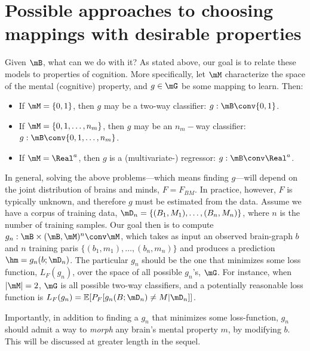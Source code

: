 \section{Possible approaches to choosing mappings with desirable properties} 

\label{sec:possible_approaches_to_choosing_mappings_with_desirable_properties}

Given $\mB$, what can we do with it? As stated above, our goal is to relate these models to properties of cognition. More specifically, let $\mM$ characterize the space of the mental (cognitive) property, and $g \in \mG$ be some mapping to learn. Then:
\begin{itemize}
	\item If $\mM=\{0,1\}$, then $g$ may be a two-way classifier: $g: \mB \conv \{0,1\}$. 
	\item If $\mM=\{0,1,\ldots, n_m\}$, then $g$ may be an $n_m-$way classifier: $g: \mB \conv \{0,1,\ldots,n_m\}$. 
	\item If $\mM=\Real^a$, then $g$ is a (multivariate-) regressor: $g: \mB \conv \Real^a$. 
\end{itemize}

In general, solving the above problems---which means finding $g$---will depend on the joint distribution of brains and minds, $F=F_{BM}$. In practice, however, $F$ is typically unknown, and therefore $g$ must be estimated from the data. Assume we have a corpus of training data, $\mD_n=\{(B_1,M_1), \ldots, (B_n, M_n)\}$, where $n$ is the number of training samples. Our goal then is to compute $g_n: \mB \times (\mB, \mM)^n \conv \mM$, which takes as input an observed brain-graph $b$ and $n$ training paris $\{(b_1,m_1), \ldots, (b_n,m_n)\}$ and produces a prediction $\hm=g_n(b; \mD_n)$. The particular $g_n$ should be the one that minimizes some loss function, $L_F(g_n)$, over the space of all possible $g_n$'s, $\mG$. For instance, when $|\mM|=2$, $\mG$ is all possible two-way classifiers, and a potentially reasonable loss function is $L_F(g_n)=\mathbb{E}[P_F[g_n(B;\mD_n) \neq M | \mD_n]]$.

Importantly, in addition to finding a $g_n$ that minimizes some loss-function, $g_n$ should admit a way to \emph{morph} any brain's mental property $m$, by modifying $b$. This will be discussed at greater length in the sequel. 

\label{sub:finding_a_good_g_n_}

